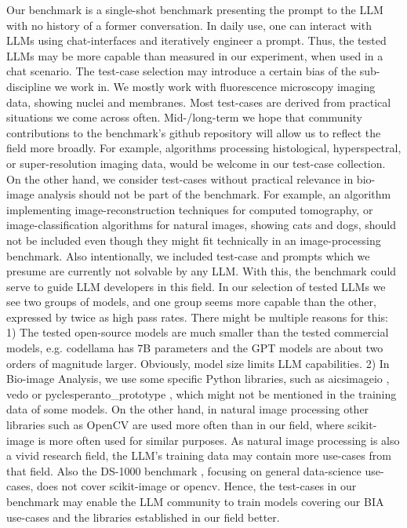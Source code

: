 \documentclass{ecai}
\begin{document}
Our benchmark is a single-shot benchmark presenting the prompt to the LLM with no history of a former conversation. In daily use, one can interact with LLMs using chat-interfaces and iteratively engineer a prompt. Thus, the tested LLMs may be more capable than measured in our experiment, when used in a chat scenario.
The test-case selection may introduce a certain bias of the sub-discipline we work in. We mostly work with fluorescence microscopy imaging data, showing nuclei and membranes. Most test-cases are derived from practical situations we come across often. Mid-/long-term we hope that community contributions to the benchmark’s github repository will allow us to reflect the field more broadly. For example, algorithms processing histological, hyperspectral, or super-resolution imaging data, would be welcome in our test-case collection. On the other hand, we consider test-cases without practical relevance in bio-image analysis should not be part of the benchmark. For example, an algorithm implementing image-reconstruction techniques for computed tomography, or image-classification algorithms for natural images, showing cats and dogs, should not be included even though they might fit technically in an image-processing benchmark. Also intentionally, we included test-case and prompts which we presume are currently not solvable by any LLM. With this, the benchmark could serve to guide LLM developers in this field.
In our selection of tested LLMs we see two groups of models, and one group seems more capable than the other, expressed by twice as high pass rates. There might be multiple reasons for this: 1) The tested open-source models are much smaller than the tested commercial models, e.g. codellama has 7B parameters and the GPT models are about two orders of magnitude larger. Obviously, model size limits LLM capabilities. 2) In Bio-image Analysis, we use some specific Python libraries, such as aicsimageio \citep{aicsimageio}, vedo \citep{musy2024} or pyclesperanto\_prototype \citep{robert_haase_2023_10432619}, which might not be mentioned in the training data of some models. On the other hand, in natural image processing other libraries such as OpenCV \citep{itseez2015opencv} are used more often than in our field, where scikit-image \citep{scikit-image} is more often used for similar purposes. As natural image processing is also a vivid research field, the LLM’s training data may contain more use-cases from that field. Also the DS-1000 benchmark \citep{lai2022ds1000}, focusing on general data-science use-cases, does not cover scikit-image or opencv. Hence, the test-cases in our benchmark may enable the LLM community to train models covering our BIA use-cases and the libraries established in our field better.
\end{document}
